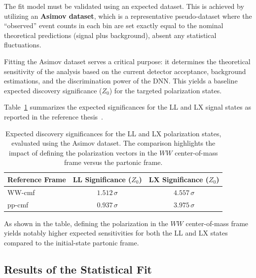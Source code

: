 \documentclass[12pt]{article}
\begin{document}
        The fit model must be validated using an expected dataset. This is achieved by utilizing an \textbf{Asimov dataset}, which is a representative pseudo-dataset where the ``observed'' event counts in each bin are set exactly equal to the nominal theoretical predictions (signal plus background), absent any statistical fluctuations.

        Fitting the Asimov dataset serves a critical purpose: it determines the theoretical sensitivity of the analysis based on the current detector acceptance, background estimations, and the discrimination power of the DNN. This yields a baseline expected discovery significance ($Z_0$) for the targeted polarization states.

        Table~\ref{tab:expected_significance} summarizes the expected significances for the LL and LX signal states as reported in the reference thesis~\cite{stange2025longitudinal}. 

        \begin{table}[htbp]
            \centering
            \caption{Expected discovery significances for the LL and LX polarization states, evaluated using the Asimov dataset. The comparison highlights the impact of defining the polarization vectors in the $WW$ center-of-mass frame versus the partonic frame.}
            \label{tab:expected_significance}
            \begin{tabular}{lcc}
                \hline
                \hline
                Reference Frame & LL Significance ($Z_0$) & LX Significance ($Z_0$) \\
                \hline
                WW-cmf & $1.512\,\sigma$ & $4.557\,\sigma$ \\
                pp-cmf & $0.937\,\sigma$ & $3.975\,\sigma$ \\
                \hline
                \hline
            \end{tabular}
        \end{table}

        As shown in the table, defining the polarization in the $WW$ center-of-mass frame yields notably higher expected sensitivities for both the LL and LX states compared to the initial-state partonic frame.


    \subsection{Results of the Statistical Fit}%
    \label{sub:results_of_the_statistical_fit}
\end{document}
